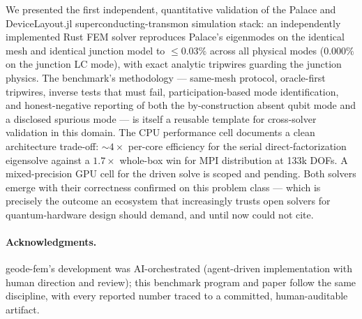 \documentclass{anvil-paper}
\begin{document}
We presented the first independent, quantitative validation of the
Palace and DeviceLayout.jl superconducting-transmon simulation stack: an
independently implemented Rust FEM solver reproduces Palace's eigenmodes on
the identical mesh and identical junction model to $\leq 0.03\%$ across
all physical modes ($0.000\%$ on the junction LC mode), with exact analytic
tripwires guarding the junction physics. The benchmark's methodology ---
same-mesh protocol, oracle-first tripwires, inverse tests that must fail,
participation-based mode identification, and honest-negative reporting of
both the by-construction absent qubit mode and a disclosed spurious mode
--- is itself a reusable template for cross-solver validation in this
domain. The CPU performance cell documents a clean architecture trade-off:
${\sim}4\times$ per-core efficiency for the serial direct-factorization
eigensolve against a $1.7\times$ whole-box win for MPI distribution at
133k DOFs. A mixed-precision GPU cell for the driven solve is scoped and
pending. Both solvers emerge with their correctness confirmed on this
problem class --- which is precisely the outcome an ecosystem that
increasingly trusts open solvers for quantum-hardware design should demand,
and until now could not cite.

\paragraph{Acknowledgments.}
geode-fem's development was AI-orchestrated (agent-driven implementation
with human direction and review); this benchmark program and paper follow
the same discipline, with every reported number traced to a committed,
human-auditable artifact.



\end{document}
